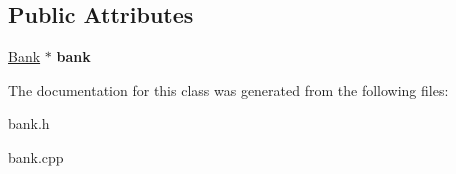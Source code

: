 \subsection*{Public Attributes}
\begin{DoxyCompactItemize}
\item 
\hypertarget{classg2c_1_1_asynchronous_bank_a46a8b0cd639a460ca0d080dad41e4a97}{
\hyperlink{classg2c_1_1_bank}{Bank} $\ast$ {\bfseries bank}}
\label{classg2c_1_1_asynchronous_bank_a46a8b0cd639a460ca0d080dad41e4a97}

\end{DoxyCompactItemize}


The documentation for this class was generated from the following files:\begin{DoxyCompactItemize}
\item 
bank.h\item 
bank.cpp\end{DoxyCompactItemize}
